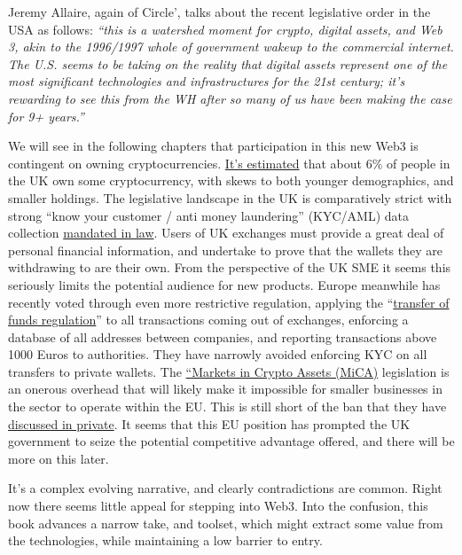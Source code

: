 Jeremy Allaire, again of Circle', talks about the recent legislative order in the USA as follows:
\textit{``this is a watershed moment for crypto, digital assets, and Web 3, akin to the 1996/1997 whole of government wakeup to the commercial internet. The U.S. seems to be taking on the reality that digital assets represent one of the most significant technologies and infrastructures for the 21st century; it's rewarding to see this from the WH after so many of us have been making the case for 9+ years.''}\par
We will see in the following chapters that participation in this new Web3 is contingent on owning cryptocurrencies. \href{https://www.finder.com/uk/cryptocurrency-statistics}{It's estimated} that about 6\% of people in the UK own some cryptocurrency, with skews to both younger demographics, and smaller holdings. The legislative landscape in the UK is comparatively strict with strong ``know your customer / anti money laundering'' (KYC/AML) data collection \href{https://www.gov.uk/guidance/money-laundering-regulations-your-responsibilities}{mandated in law}. Users of UK exchanges must provide a great deal of personal financial information, and undertake to prove that the wallets they are withdrawing to are their own. From the perspective of the UK SME it seems this seriously limits the potential audience for new products. Europe meanwhile has recently voted through even more restrictive regulation, applying the ``\href{https://www.europarl.europa.eu/legislative-train/theme-an-economy-that-works-for-people/file-revision-of-the-regulation-on-transfers-of-funds}{transfer of funds regulation}'' to all transactions coming out of exchanges, enforcing a database of all addresses between companies, and reporting transactions above 1000 Euros to authorities. They have narrowly avoided enforcing KYC on all transfers to private wallets. The \href{https://www.consilium.europa.eu/en/press/press-releases/2022/06/30/digital-finance-agreement-reached-on-european-crypto-assets-regulation-mica/}{``Markets in Crypto Assets (MiCA)} legislation is an onerous overhead that will likely make it impossible for smaller businesses in the sector to operate within the EU. This is still short of the ban that they have \href{https://netzpolitik.org/2022/climate-measures-behind-closed-doors-eu-officials-talk-about-banning-bitcoin/}{discussed in private}. It seems that this EU position has prompted the UK government to seize the potential competitive advantage offered, and there will be more on this later.\par
It's a complex evolving narrative, and clearly contradictions are common. Right now there seems little appeal for stepping into Web3. Into the confusion, this book advances a narrow take, and toolset, which might extract some value from the technologies, while maintaining a low barrier to entry.\par 

